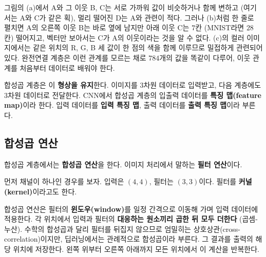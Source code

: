 \documentclass[11pt,a4paper]{article}
\begin{document}
그림의 (a)에서 A와 그 이웃 B, C는 서로 가까워 값이 비슷하거나 함께 변하고 (여기서는 A와 C가 같은 획),
멀리 떨어진 D는 A와 관련이 적다. 그러나 (b)처럼 한 줄로 펼치면 A의 오른쪽 이웃 B는 바로 옆에 남지만
아래 이웃 C는 $7$칸 (MNIST라면 $28$칸) 떨어지고, 벡터만 보아서는 C가 A의 이웃이라는 것을 알 수 없다.
(c)의 컬러 이미지에서는 같은 위치의 R, G, B 세 값이 한 점의 색을 함께 이루므로 밀접하게 관련되어 있다.
완전연결 계층은 이런 관계를 모르는 채로 $784$개의 값을 똑같이 다루어, 이웃 관계를 처음부터 데이터로 배워야 한다.

합성곱 계층은 이 \textbf{형상을 유지}한다. 이미지를 3차원 데이터로 입력받고, 다음 계층에도 3차원 데이터로 전달한다.
CNN에서 합성곱 계층의 입출력 데이터를 \textbf{특징 맵(feature map)}이라 한다.
입력 데이터를 \textbf{입력 특징 맵}, 출력 데이터를 \textbf{출력 특징 맵}이라 부른다.

\subsection{합성곱 연산}\label{sec:convop}

합성곱 계층에서는 \textbf{합성곱 연산}을 한다. 이미지 처리에서 말하는 \textbf{필터 연산}이다.

먼저 채널이 하나인 경우를 보자. 입력은 $(4,4)$, 필터는 $(3,3)$이다.
필터를 \textbf{커널(kernel)}이라고도 한다.


\begin{center}
\end{center}

합성곱 연산은 필터의 \textbf{윈도우(window)}를 일정 간격으로 이동해 가며 입력 데이터에 적용한다.
각 위치에서 입력과 필터의 \textbf{대응하는 원소끼리 곱한 뒤 모두 더한다} (곱셈-누산).
수학의 합성곱과 달리 필터를 뒤집지 않으므로 엄밀히는 상호상관(cross-correlation)이지만, 딥러닝에서는 관례적으로 합성곱이라 부른다.
그 결과를 출력의 해당 위치에 저장한다. 왼쪽 위부터 오른쪽 아래까지 모든 위치에서 이 계산을 반복한다.
\end{document}
